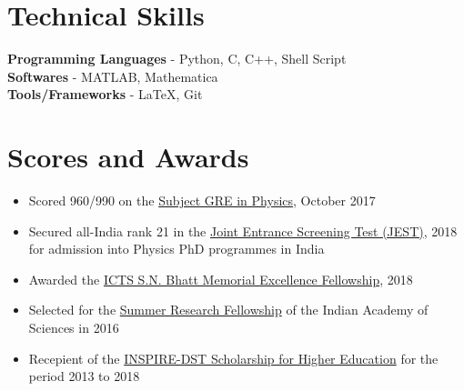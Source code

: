 \documentclass[margin, centered]{res}
\begin{document}
\begin{resume}
\section{Technical \hspace{2mm} Skills}
\textbf{Programming Languages} - Python, C, C++, Shell Script\\
\textbf{Softwares} - MATLAB, Mathematica \\
\textbf{Tools/Frameworks} - \LaTeX, Git





\section{Scores and Awards}
\begin{itemize}[leftmargin=*]
 \item Scored 960/990 on the \href{https://www.ets.org/gre/subject/about/content/physics}{Subject GRE in Physics}, October 2017
 \item Secured all-India rank 21 in the \href{https://www.jest.org.in/}{Joint Entrance Screening Test (JEST)}, 2018 for admission into Physics PhD programmes in India
 \item Awarded the \href{https://www.icts.res.in/academic/summer-research-program}{ICTS S.N. Bhatt Memorial Excellence Fellowship}, 2018
 \item Selected for the \href{http://web-japps.ias.ac.in:8080/fellowship2018/}{Summer Research Fellowship} of the Indian Academy of Sciences in 2016
 \item Recepient of the \href{http://www.inspire-dst.gov.in/scholarship.html}{INSPIRE-DST Scholarship for Higher Education} for the period 2013 to 2018
\end{itemize}


\end{resume}
\end{document}
